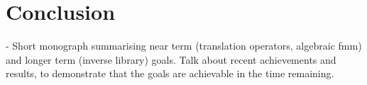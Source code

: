 \chapter{Conclusion}\label{chpt:conclusion}

- Short monograph summarising near term (translation operators, algebraic fmm) and longer term (inverse library) goals. Talk about recent achievements and results, to demonstrate that the goals are achievable in the time remaining.



